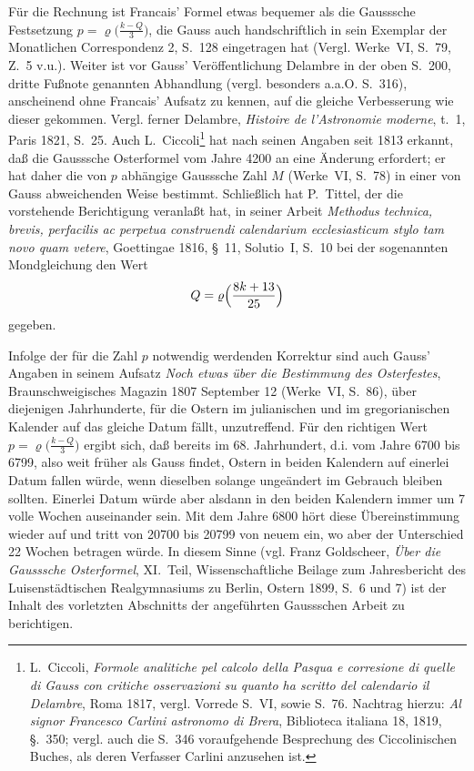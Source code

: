 \documentclass[12pt,a4paper]{article}
\theoremstyle{plain}
\theoremstyle{definition}
\theoremstyle{remark}
\begin{document}
Für die Rechnung ist Francais' Formel etwas bequemer als die Gausssche Festsetzung $p = \varrho\bigl(\frac{k - Q}{3}\bigr)$, die Gauss auch handschriftlich in sein Exemplar der Monatlichen Correspondenz 2, S.~128 eingetragen hat (Vergl. Werke~VI, S.~79, Z.~5 v.u.). Weiter ist vor Gauss' Veröffentlichung Delambre in der oben S.~200, dritte Fußnote genannten Abhandlung (vergl. besonders a.a.O. S.~316), anscheinend ohne Francais' Aufsatz zu kennen, auf die gleiche Verbesserung wie dieser gekommen. Vergl. ferner Delambre, \textit{Histoire de l'Astronomie moderne}, t.~1, Paris 1821, S.~25. Auch L.~Ciccoli\footnote{L.~Ciccoli, \textit{Formole analitiche pel calcolo della Pasqua e corresione di quelle di Gauss con critiche osservazioni su quanto ha scritto del calendario il Delambre}, Roma 1817, vergl. Vorrede S.~VI, sowie S.~76. Nachtrag hierzu: \textit{Al signor Francesco Carlini astronomo di Brera}, Biblioteca italiana 18, 1819, §.~350; vergl. auch die S.~346 voraufgehende Besprechung des Ciccolinischen Buches, als deren Verfasser Carlini anzusehen ist.} hat nach seinen Angaben seit 1813 erkannt, daß die Gausssche Osterformel vom Jahre 4200 an eine Änderung erfordert; er hat daher die von $p$ abhängige Gausssche Zahl $M$ (Werke~VI, S.~78) in einer von Gauss abweichenden Weise bestimmt. Schließlich hat P.~Tittel, der die vorstehende Berichtigung veranlaßt hat, in seiner Arbeit \textit{Methodus technica, brevis, perfacilis ac perpetua construendi calendarium ecclesiasticum stylo tam novo quam vetere}, Goettingae 1816, §~11, Solutio~I, S.~10 bei der sogenannten Mondgleichung den Wert
\[
Q = \varrho\Bigl(\frac{8k + 13}{25}\Bigr)
\]
gegeben.

Infolge der für die Zahl $p$ notwendig werdenden Korrektur sind auch Gauss' Angaben in seinem Aufsatz \textit{Noch etwas über die Bestimmung des Osterfestes}, Braunschweigisches Magazin 1807 September 12 (Werke~VI, S.~86), über diejenigen Jahrhunderte, für die Ostern im julianischen und im gregorianischen Kalender auf das gleiche Datum fällt, unzutreffend. Für den richtigen Wert $p = \varrho\bigl(\frac{k - Q}{3}\bigr)$ ergibt sich, daß bereits im 68. Jahrhundert, d.i. vom Jahre 6700 bis 6799, also weit früher als Gauss findet, Ostern in beiden Kalendern auf einerlei Datum fallen würde, wenn dieselben solange ungeändert im Gebrauch bleiben sollten. Einerlei Datum würde aber alsdann in den beiden Kalendern immer um 7 volle Wochen auseinander sein. Mit dem Jahre 6800 hört diese Übereinstimmung wieder auf und tritt von 20700 bis 20799 von neuem ein, wo aber der Unterschied 22 Wochen betragen würde. In diesem Sinne (vgl. Franz Goldscheer, \textit{Über die Gausssche Osterformel}, XI.~Teil, Wissenschaftliche Beilage zum Jahresbericht des Luisenstädtischen Realgymnasiums zu Berlin, Ostern 1899, S.~6 und 7) ist der Inhalt des vorletzten Abschnitts der angeführten Gaussschen Arbeit zu berichtigen.
\end{document}
